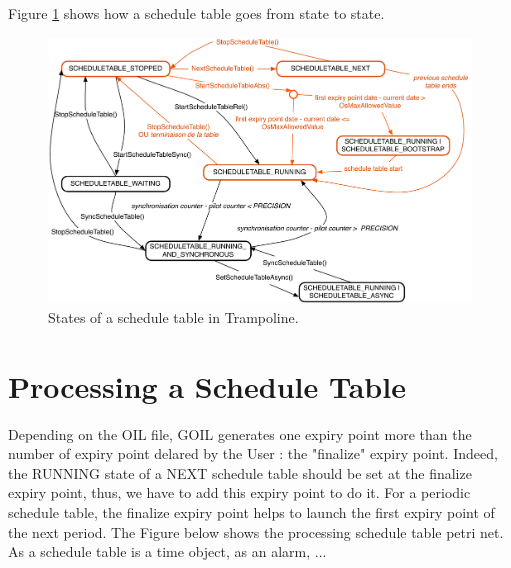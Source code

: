 Figure  \ref{fig:STstates} shows how a schedule table goes from state to state.

\begin{figure}[htbp] %
   \centering
   \includegraphics[width=6in]{pictures/STstates.pdf}  
   \caption{States of a schedule table in Trampoline.}
   \label{fig:STstates}
\end{figure} 
	
\section{Processing a Schedule Table}

Depending on the OIL file, GOIL generates one expiry point more than the number of expiry point delared by the User : the "finalize" expiry point. Indeed, the RUNNING state of a NEXT schedule table should be set at the finalize expiry point, thus, we have to add this expiry point to do it. For a periodic schedule table, the finalize expiry point helps to launch the first expiry point of the next period. The Figure below shows the processing schedule table petri net. \\%

As a schedule table is a time object, as an alarm, ...\\






























